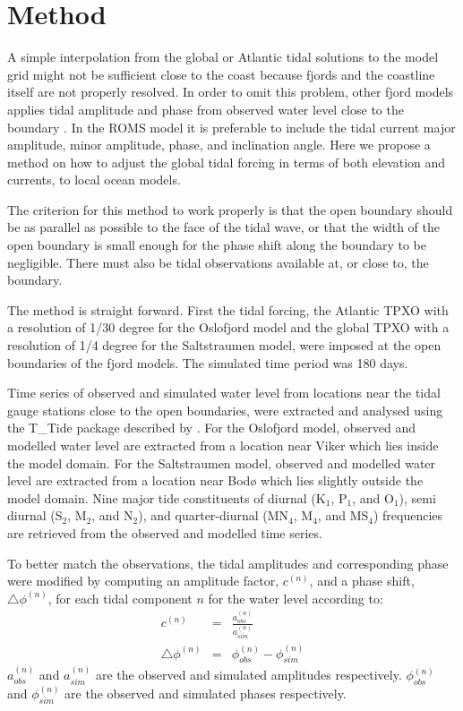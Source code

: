 \section{Method}

A simple interpolation from the global or Atlantic tidal solutions to the model grid might not be sufficient close to the coast because fjords and the coastline itself are not properly resolved. In order to omit this problem, other fjord models applies tidal amplitude and phase from observed water level close to the boundary \cite[i.e.]{svendsen96,lynge13}. In the ROMS model it is preferable to include the tidal current major amplitude, minor amplitude, phase, and inclination angle. Here we propose a method on how to adjust the global tidal forcing in terms of both elevation and currents, to local ocean models. 

The criterion for this method to work properly is that the open boundary should be as parallel as possible to the face of the tidal wave, or that the width of the open boundary is small enough for the phase shift along the boundary to be negligible. There must also be tidal observations available at, or close to, the boundary.

The method is straight forward. First the tidal forcing, the Atlantic TPXO with a resolution of 1/30 degree for the Oslofjord model and the global TPXO with a resolution of 1/4 degree for the Saltstraumen model, were imposed at the open boundaries of the fjord models. The simulated time period was 180 days. 

Time series of observed and simulated water level from locations near the tidal gauge stations close to the open boundaries, were extracted and analysed using the T\_Tide package described by \cite{pawlowicz02}. For the Oslofjord model, observed and modelled water level are extracted from a location near Viker which lies inside the model domain. For the Saltstraumen model, observed and modelled water level are extracted from a location near Bod{\o} which lies slightly outside the model domain. Nine major tide constituents of diurnal (K$_1$, P$_1$, and O$_1$), semi diurnal (S$_2$, M$_2$, and N$_2$), and quarter-diurnal (MN$_4$, M$_4$, and MS$_4$) frequencies are retrieved from the observed and modelled time series. 

To better match the observations, the tidal amplitudes and corresponding phase were modified by computing an amplitude factor, $c^{(n)}$, and a phase shift, $\triangle \phi^{(n)}$, for each tidal component $n$ for the water level according to:
\begin{eqnarray}
c^{(n)} &=& \frac{a^{(n)}_{obs}}{a^{(n)}_{sim}} \\
\triangle \phi^{(n)} &=& \phi^{(n)}_{obs} - \phi^{(n)}_{sim}
\end{eqnarray}
$a^{(n)}_{obs}$ and $a^{(n)}_{sim}$ are the observed and simulated amplitudes respectively. $\phi^{(n)}_{obs}$ and $\phi^{(n)}_{sim}$ are the observed and simulated phases respectively. 

